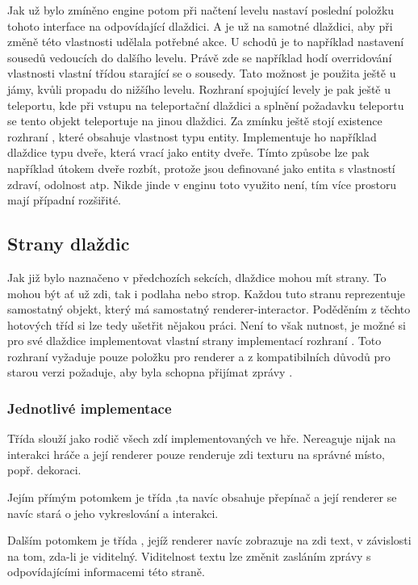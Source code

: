 Jak už bylo zmíněno engine potom při načtení levelu nastaví poslední položku tohoto interface 
 na odpovídající dlaždici. A je už na samotné dlaždici, aby při změně této vlastnosti udělala 
potřebné akce. U schodů je to například nastavení sousedů vedoucích do dalšího levelu. Právě zde se například hodí 
overridování vlastnosti  vlastní třídou starající se o sousedy. Tato možnost je použita ještě u jámy,
kvůli propadu do nižšího levelu. Rozhraní spojující levely je pak ještě u teleportu, kde při vstupu na teleportační
dlaždici a splnění požadavku teleportu se tento objekt teleportuje na jinou dlaždici. Za zmínku ještě stojí existence
rozhraní , které obsahuje vlastnost typu entity. Implementuje ho například dlaždice typu dveře,
která vrací jako entity dveře. Tímto způsobe lze pak například útokem dveře rozbít, protože jsou definované jako 
entita s vlastností zdraví, odolnost atp. Nikde jinde v enginu toto využito není, tím více prostoru mají případní
rozšiřité.

\subsection{Strany dlaždic}
Jak již bylo naznačeno v předchozích sekcích, dlaždice mohou mít strany. To mohou být ať už zdi, tak i podlaha nebo strop.
Každou tuto stranu reprezentuje samostatný objekt, který má samostatný renderer-interactor. Poděděním z těchto hotových tříd
si lze tedy ušetřit nějakou práci. Není to však nutnost, je možné si pro své dlaždice implementovat vlastní
strany implementací rozhraní . Toto rozhraní vyžaduje pouze položku pro renderer a z kompatibilních důvodů
pro starou verzi požaduje, aby byla schopna přijímat zprávy .

\subsubsection{Jednotlivé implementace}
Třída  slouží jako rodič všech zdí implementovaných ve hře. Nereaguje nijak na interakci
hráče a její renderer pouze renderuje zdi  texturu na správné místo, popř. dekoraci.

Jejím přímým potomkem je třída ,ta navíc obsahuje přepínač a její renderer se navíc
stará o jeho vykreslování a interakci.

Dalším potomkem je třída , jejíž renderer navíc zobrazuje na zdi text, v závislosti na tom,
zda-li je viditelný. Viditelnost textu lze změnit zasláním zprávy s odpovídajícími informacemi této straně.

